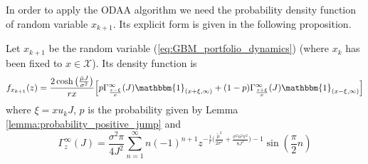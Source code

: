 In order to apply the \gls{ODAA} algorithm we need the probability density function of random variable $x_{k+1}$. Its explicit form is given in the following proposition.
\begin{proposition}
	Let $x_{k+1}$ be the random variable (\ref{eq:GBM_portfolio_dynamics}) (where $x_k$ has been fixed to $x \in \mathcal{X}$). Its density function is
	\begin{equation}\label{eq:DensityGBM}
	f_{x_{k+1}}(z) = \frac{2\cosh\big(\frac{\tilde{\mu}J}{\sigma^2}\big)}{rx}\Big[p \Gamma^\infty_{\frac{z-\xi}{x}}(J) \mathbbm{1}_{(x+\xi,\infty)} + (1-p)\Gamma^\infty_{\frac{z+\xi}{x}}(J) \mathbbm{1}_{(x-\xi,\infty)}  \Big]
	\end{equation}
	where $\xi = xu_kJ$, $p$ is the probability given by Lemma \ref{lemma:probability_positive_jump} and
	\begin{equation}\label{eq:Gamma}
	\Gamma^\infty_{z}(J) =\frac{\sigma^2\pi}{4J^2}\sum_{n=1}^{\infty}n(-1)^{n+1}z^{-\frac{1}{r}\big(\frac{\tilde{\mu}^2}{2\sigma^2} + \frac{\sigma^2n^2\pi^2}{8J^2}\big)-1}\sin(\frac{\pi}{2}n)
	\end{equation}
\end{proposition}
